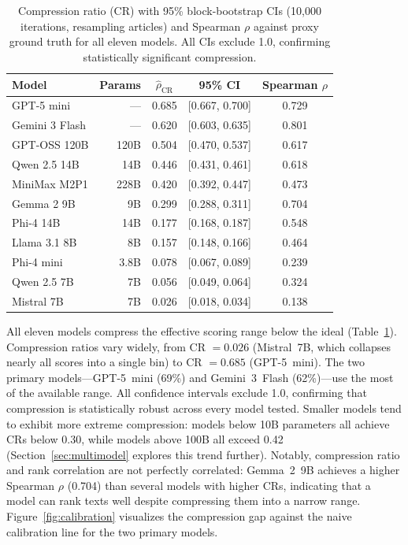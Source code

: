 \documentclass[11pt]{article}
\begin{document}
\begin{table}[!t]
\centering
\caption{Compression ratio (CR) with 95\% block-bootstrap CIs (10{,}000 iterations, resampling articles) and Spearman $\rho$ against proxy ground truth for all eleven models. All CIs exclude 1.0, confirming statistically significant compression.}
\label{tab:compression}
\small
\begin{tabular}{@{}lrccc@{}}
\toprule
\textbf{Model} & \textbf{Params} & $\hat{\rho}_{\text{CR}}$ & \textbf{95\% CI} & \textbf{Spearman} $\rho$ \\
\midrule
GPT-5 mini & --- & 0.685 & [0.667, 0.700] & 0.729 \\
Gemini 3 Flash & --- & 0.620 & [0.603, 0.635] & 0.801 \\
GPT-OSS 120B & 120B & 0.504 & [0.470, 0.537] & 0.617 \\
Qwen 2.5 14B & 14B & 0.446 & [0.431, 0.461] & 0.618 \\
MiniMax M2P1 & 228B & 0.420 & [0.392, 0.447] & 0.473 \\
Gemma 2 9B & 9B & 0.299 & [0.288, 0.311] & 0.704 \\
Phi-4 14B & 14B & 0.177 & [0.168, 0.187] & 0.548 \\
Llama 3.1 8B & 8B & 0.157 & [0.148, 0.166] & 0.464 \\
Phi-4 mini & 3.8B & 0.078 & [0.067, 0.089] & 0.239 \\
Qwen 2.5 7B & 7B & 0.056 & [0.049, 0.064] & 0.324 \\
Mistral 7B & 7B & 0.026 & [0.018, 0.034] & 0.138 \\
\bottomrule
\end{tabular}
\end{table}

All eleven models compress the effective scoring range below the ideal (Table~\ref{tab:compression}). Compression ratios vary widely, from CR $= 0.026$ (Mistral~7B, which collapses nearly all scores into a single bin) to CR $= 0.685$ (GPT-5~mini). The two primary models---GPT-5~mini (69\%) and Gemini~3~Flash (62\%)---use the most of the available range. All confidence intervals exclude 1.0, confirming that compression is statistically robust across every model tested. Smaller models tend to exhibit more extreme compression: models below 10B parameters all achieve CRs below 0.30, while models above 100B all exceed 0.42 (Section~\ref{sec:multimodel} explores this trend further). Notably, compression ratio and rank correlation are not perfectly correlated: Gemma~2~9B achieves a higher Spearman $\rho$ (0.704) than several models with higher CRs, indicating that a model can rank texts well despite compressing them into a narrow range. Figure~\ref{fig:calibration} visualizes the compression gap against the naive calibration line for the two primary models.
\end{document}
